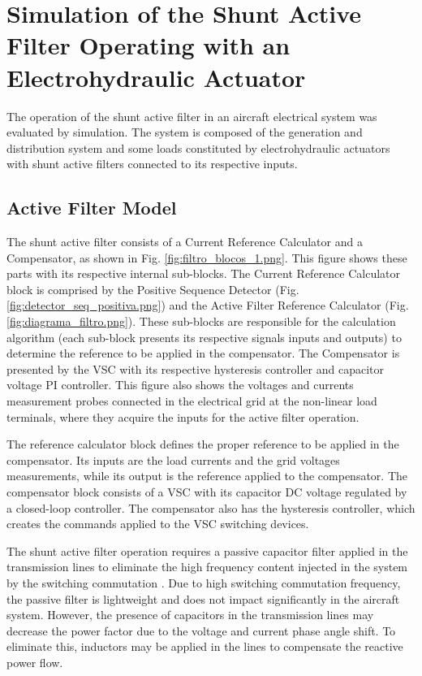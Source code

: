 \section{Simulation of the Shunt Active Filter Operating with an Electrohydraulic Actuator}

The operation of the shunt active filter in an aircraft electrical system was evaluated by simulation. The system is composed of the generation and distribution system and some loads constituted by electrohydraulic actuators with shunt active filters connected to its respective inputs.

\subsection{Active Filter Model}

The shunt active filter consists of a Current Reference Calculator and a Compensator, as shown in Fig. \ref{fig:filtro_blocos_1.png}. This figure shows these parts with its respective internal sub-blocks. The Current Reference Calculator block is comprised by the Positive Sequence Detector (Fig. \ref{fig:detector_seq_positiva.png}) and the Active Filter Reference Calculator (Fig. \ref{fig:diagrama_filtro.png}). These sub-blocks are responsible for the calculation algorithm (each sub-block presents its respective signals inputs and outputs) to determine the reference to be applied in the compensator. The Compensator is presented by the VSC with its respective hysteresis controller and capacitor voltage PI controller. This figure also shows the voltages and currents measurement probes connected in the electrical grid at the non-linear load terminals, where they acquire the inputs for the active filter operation.

The reference calculator block defines the proper reference to be applied in the compensator. Its inputs are the load currents and the grid voltages measurements, while its output is the reference applied to the compensator. The compensator block consists of a VSC with its capacitor DC voltage regulated by a closed-loop controller. The compensator also has the hysteresis controller, which creates the commands applied to the VSC switching devices.

The shunt active filter operation requires a passive capacitor filter applied in the transmission lines to eliminate the high frequency content injected in the system by the switching commutation \citep{Akagi2007}. Due to high switching commutation frequency, the passive filter is lightweight and does not impact significantly in the aircraft system. However, the presence of capacitors in the transmission lines may decrease the power factor due to the voltage and current phase angle shift. To eliminate this, inductors may be applied in the lines to compensate the reactive power flow.

